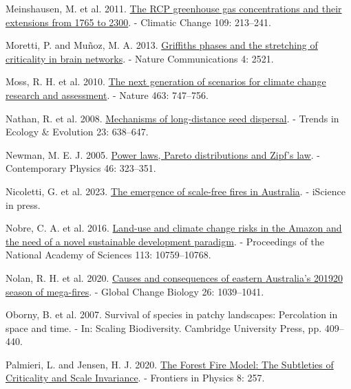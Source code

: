 \documentclass[
]{article}
\newlength{\cslhangindent}
\newenvironment{CSLReferences}[2] %
 {\begin{list}{}{%
  \setlength{\itemindent}{0pt}
  \setlength{\leftmargin}{0pt}
  \setlength{\parsep}{0pt}
  \ifodd #1
   \setlength{\leftmargin}{\cslhangindent}
   \setlength{\itemindent}{-1\cslhangindent}
  \fi
  \setlength{\itemsep}{#2\baselineskip}}}
 {\end{list}}
\begin{document}
\begin{CSLReferences}{1}{1}
Meinshausen, M. et al. 2011.
\href{https://doi.org/10.1007/s10584-011-0156-z}{The {RCP} greenhouse
gas concentrations and their extensions from 1765 to 2300}. - Climatic
Change 109: 213--241.

Moretti, P. and Muñoz, M. A. 2013.
\href{https://doi.org/10.1038/ncomms3521}{Griffiths phases and the
stretching of criticality in brain networks}. - Nature Communications 4:
2521.

Moss, R. H. et al. 2010. \href{https://doi.org/10.1038/nature08823}{The
next generation of scenarios for climate change research and
assessment}. - Nature 463: 747--756.

Nathan, R. et al. 2008.
\href{https://doi.org/10.1016/j.tree.2008.08.003}{Mechanisms of
long-distance seed dispersal}. - Trends in Ecology \& Evolution 23:
638--647.

Newman, M. E. J. 2005.
\href{https://doi.org/10.1080/00107510500052444}{Power laws, {Pareto}
distributions and {Zipf}'s law}. - Contemporary Physics 46: 323--351.

Nicoletti, G. et al. 2023.
\href{https://doi.org/10.1016/j.isci.2023.106181}{The emergence of
scale-free fires in {Australia}}. - iScience in press.

Nobre, C. A. et al. 2016.
\href{https://doi.org/10.1073/pnas.1605516113}{Land-use and climate
change risks in the {Amazon} and the need of a novel sustainable
development paradigm}. - Proceedings of the National Academy of Sciences
113: 10759--10768.

Nolan, R. H. et al. 2020.
\href{https://doi.org/10.1111/gcb.14987}{Causes and consequences of
eastern {Australia}'s 2019{\textendash}20 season of mega-fires}. -
Global Change Biology 26: 1039--1041.

Oborny, B. et al. 2007. Survival of species in patchy landscapes:
Percolation in space and time. - In: Scaling {Biodiversity}. {Cambridge
University Press}, pp. 409--440.

Palmieri, L. and Jensen, H. J. 2020.
\href{https://doi.org/10.3389/fphy.2020.00257}{The {Forest Fire Model}:
{The Subtleties} of {Criticality} and {Scale Invariance}}. - Frontiers
in Physics 8: 257.


\end{CSLReferences}
\end{document}
